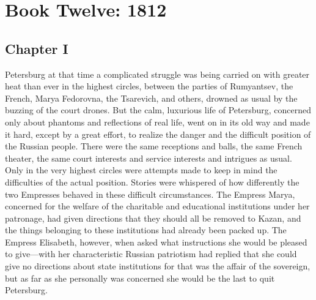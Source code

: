 \part*{Book Twelve: 1812}


\chapter*{Chapter I}
\ifaudio 
{}
\fi

 Petersburg at that time a complicated struggle was being
carried on with greater heat than ever in the highest circles,
between the parties of Rumyantsev, the French, Marya Fedorovna,
the Tsarevich, and others, drowned as usual by the buzzing of the
court drones. But the calm, luxurious life of Petersburg,
concerned only about phantoms and reflections of real life, went
on in its old way and made it hard, except by a great effort, to
realize the danger and the difficult position of the Russian
people. There were the same receptions and balls, the same French
theater, the same court interests and service interests and
intrigues as usual. Only in the very highest circles were
attempts made to keep in mind the difficulties of the actual
position.  Stories were whispered of how differently the two
Empresses behaved in these difficult circumstances. The Empress
Marya, concerned for the welfare of the charitable and
educational institutions under her patronage, had given
directions that they should all be removed to Kazan, and the
things belonging to these institutions had already been packed
up. The Empress Elisabeth, however, when asked what instructions
she would be pleased to give---with her characteristic Russian
patriotism had replied that she could give no directions about
state institutions for that was the affair of the sovereign, but
as far as she personally was concerned she would be the last to
quit Petersburg.

